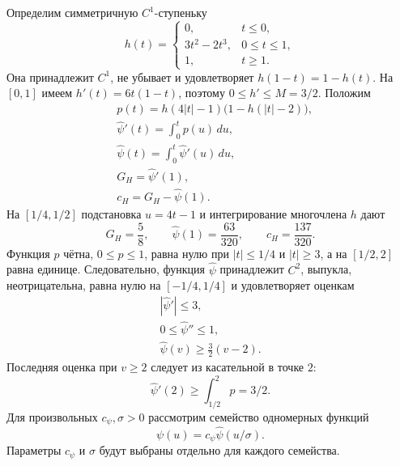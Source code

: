 Определим симметричную $C^1$-ступеньку
\[
 h(t)=\begin{cases}
 0,&t\le0,\\
 3t^2-2t^3,&0\le t\le1,\\
 1,&t\ge1.
 \end{cases}
\]
Она принадлежит $C^1$, не убывает и удовлетворяет $h(1-t)=1-h(t)$.
На $[0,1]$ имеем $h'(t)=6t(1-t)$, поэтому $0\le h'\le M=3/2$.
Положим
\begin{equation}\label{eq:lower-profile}
 \begin{aligned}
 &p(t)=h(4|t|-1)\bigl(1-h(|t|-2)\bigr),\\
 &\widehat\psi'(t)=\int_0^t p(u)\,du,\\
 &\widehat\psi(t)=\int_0^t\widehat\psi'(u)\,du,\\
 &G_H=\widehat\psi'(1),\\
 &c_H=G_H-\widehat\psi(1).
 \end{aligned}
\end{equation}
На $[1/4,1/2]$ подстановка $u=4t-1$ и интегрирование многочлена $h$
дают
\begin{equation}\label{eq:lower-profile-numbers}
 G_H=\frac58,\qquad \widehat\psi(1)=\frac{63}{320},\qquad
 c_H=\frac{137}{320}.
\end{equation}
Функция $p$ чётна, $0\le p\le1$, равна нулю при $|t|\le1/4$
и $|t|\ge3$, а на $[1/2,2]$ равна единице.
Следовательно, функция $\widehat\psi$ принадлежит $C^2$, выпукла, неотрицательна, равна нулю
на $[-1/4,1/4]$ и удовлетворяет оценкам
\begin{equation}
\label{eq:lower-profile-bounds}
 \begin{gathered}
 |\widehat\psi'|\le3,\\
 0\le\widehat\psi''\le1,\\
 \widehat\psi(v)\ge\tfrac32(v-2).
 \end{gathered}
\end{equation}
Последняя оценка при $v\ge2$ следует из касательной в точке $2$:
\[
 \widehat\psi'(2)\ge\int_{1/2}^2p=3/2.
\]
Для произвольных $c_{\psi},\sigma>0$ рассмотрим семейство одномерных функций
\[
 \psi(u)=c_{\psi}\widehat\psi(u/\sigma).
\]
Параметры $c_{\psi}$ и $\sigma$ будут выбраны отдельно для каждого семейства.

